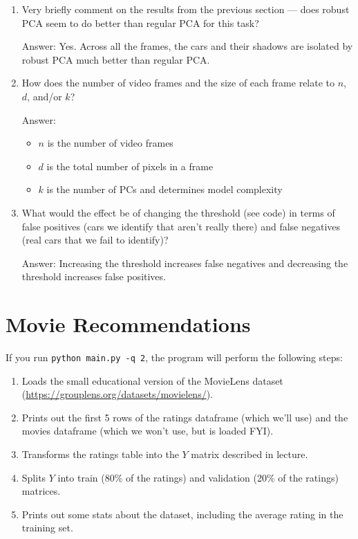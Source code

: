 \documentclass{article}
\newenvironment{answer}{\par\begingroup\color{gre}Answer: }{\endgroup}
\begin{document}
\begin{enumerate}
    \item Very briefly comment on the results from the previous section --- does robust PCA seem to do better than regular PCA for this task?
    \begin{answer}
        Yes. Across all the frames, the cars and their shadows are isolated by robust PCA much better than regular PCA.
    \end{answer}
    \item How does the number of video frames and the size of each frame relate to $n$, $d$, and/or $k$?
    \begin{answer}
        \begin{itemize}
            \item $n$ is the number of video frames
            \item $d$ is the total number of pixels in a frame
            \item $k$ is the number of PCs and determines model complexity
        \end{itemize}
    \end{answer}
    \item What would the effect be of changing the threshold (see code) in terms of false positives (cars we identify that aren't really there) and false negatives (real cars that we fail to identify)?
    \begin{answer}
        Increasing the threshold increases false negatives and decreasing the threshold increases false positives.
    \end{answer}
\end{enumerate}


\section{Movie Recommendations}

If you run \texttt{python main.py -q 2}, the program will perform the following steps:

\begin{enumerate}
\item Loads the small educational version of the MovieLens dataset (\url{https://grouplens.org/datasets/movielens/}).
\item Prints out the first 5 rows of the ratings dataframe (which we'll use) and the movies dataframe (which we won't use, but is loaded FYI).
\item Transforms the ratings table into the $Y$ matrix described in lecture.
\item Splits $Y$ into train (80\% of the ratings) and validation (20\% of the ratings) matrices.
\item Prints out some stats about the dataset, including the average rating in the training set.
\end{enumerate}
\end{document}
